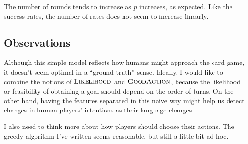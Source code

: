 \documentclass[11pt]{article}
\newcommand{\lkhd}{\textsc{Likelihood}}
\newcommand{\goodaction}{\textsc{GoodAction}}
\begin{document}
The number of rounds tends to increase as $p$ increases, as expected. Like the success rates, the number of rates does not seem to increase linearly.

\subsection{Observations}

Although this simple model reflects how humans might approach the card game, it doesn't seem optimal in a ``ground truth'' sense. Ideally, I would like to combine the notions of $\lkhd$ and $\goodaction$, because the likelihood or feasibility of obtaining a goal should depend on the order of turns. On the other hand, having the features separated in this naive way might help us detect changes in human players' intentions as their language changes.

I also need to think more about how players should choose their actions. The greedy algorithm I've written seems reasonable, but still a little bit ad hoc.
\end{document}
